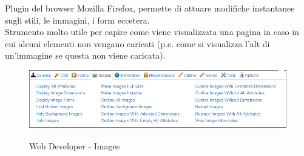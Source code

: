 Plugin del browser Mozilla Firefox, permette di attuare modifiche instantanee sugli stili, le immagini, i form eccetera.\\
Strumento molto utile per capire come viene visualizzata una pagina in caso in cui alcuni elementi non vengano caricati (p.e. come si visualizza l'alt di un'immagine se questa non viene caricata). 
\begin{figure}[!h]
	\centering
	\includegraphics[width=0.7\linewidth]{sezioni/FaseTest/Immagini/web_developer.png}\\
	\caption{Web Developer - Images}
	\label{Fig:webDev}
\end{figure} 